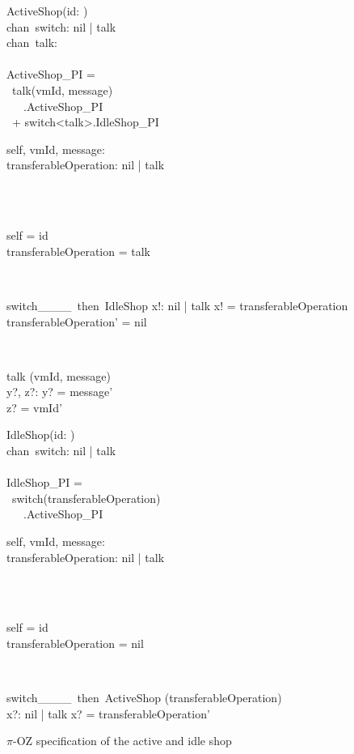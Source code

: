 \begin{figure}[H]
\centering
\begin{sidebyside}
\begin{class}{ActiveShop(id: \integer)}
\ 
\\chan\ switch: nil | talk
\ 
\\chan\ talk:\integer \times \integer
\ \\ \
\\ActiveShop\_PI = 
\\ \ talk(vmId, message)
\ \\ \ \ \ .ActiveShop\_PI
\\ \ + switch<talk>.IdleShop\_PI
\\\begin{state}
self, vmId, message: \integer
\\transferableOperation: nil | talk
\end{state} 
\\
\begin{init}
\\self = id
\\transferableOperation = talk
\end{init} 
\\
\begin{op}{switch\_\_\_\_\ then\ IdleShop}
x!: nil | talk
\ST
x! = transferableOperation
\\transferableOperation' = nil
\end{op}
\\
\begin{op}{talk}
\Delta (vmId, message)
\\y?, z?: \integer
\ST
y? = message'
\\z? = vmId'
\end{op}
\end{class}
\nextside
\begin{class}{IdleShop(id: \integer)}
\ 
\\chan\ switch: nil | talk
\ \\ \
\\IdleShop\_PI = 
\\ \  switch(transferableOperation)
\ \\ \ \ \ .ActiveShop\_PI
\\
\begin{state}
self, vmId, message: \integer
\\transferableOperation: nil | talk
\end{state} 
\\
\begin{init}
\\self = id
\\transferableOperation = nil
\end{init} 
\\
\begin{op}{switch\_\_\_\_\ then\ ActiveShop}
\Delta (transferableOperation)
\\x?: nil | talk
\ST
x? = transferableOperation'
\end{op}
\end{class}
\end{sidebyside}
\caption{$\pi$-OZ specification of the active and idle shop}
\label{comp_oz_pi_statefull_shop}
\end{figure}